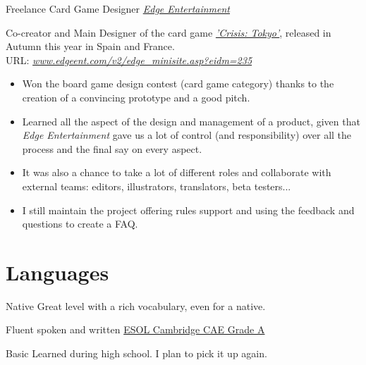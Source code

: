 \documentclass[11pt,a4paper,roman]{moderncv}
\begin{document}
	{Freelance Card Game Designer}
	{ \textit{\href{http://edgeent.com}{Edge Entertainment}}}
	{}
	{}
	{Co-creator and Main Designer of the card game \textit{\href{http://edgeent.com}{'Crisis: Tokyo'}}, released in Autumn this year in Spain and France. 
	\\URL: \textit{\href{www.edgeent.com/v2/edge\_minisite.asp?eidm=235}{www.edgeent.com/v2/edge\_minisite.asp?eidm=235}}
\begin{itemize}
	\item Won the board game design contest (card game category) thanks to the 
	creation of a convincing prototype and a good pitch.
	\item Learned all the aspect of the design and management of a product, given 
	that \textit{Edge Entertainment} gave us a lot of control (and responsibility) 
	over all the process and the final say on every aspect.
	\item It was also a chance to take a lot of different roles and collaborate 
	with external teams: editors, illustrators, translators, beta testers...
	\item I still maintain the project offering rules support and using the feedback
	and questions to create a FAQ.
\end{itemize}}




\section{Languages}
	{Native}
	{Great level with a rich vocabulary, even for a native.}

	{Fluent spoken and written}
	{\href{https://dl.dropbox.com/u/87894135/StatementOfResult.pdf}
	{ESOL Cambridge CAE Grade A}}

	{Basic}
	{Learned during high school. I plan to pick it up again.}

\end{document}
